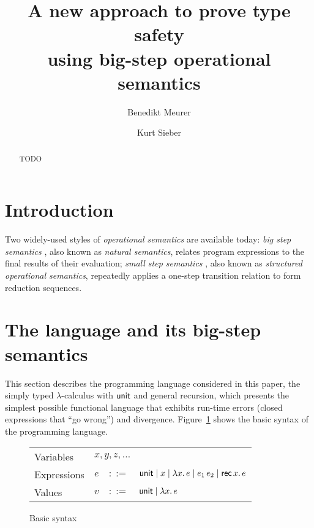 \documentclass[12pt,a2paper,draft]{article}
\newcommand{\abstr}[2]{\ensuremath{\lambda{#1}.\,{#2}}}
\newcommand{\app}[2]{\ensuremath{{#1}\,{#2}}}
\newcommand{\rec}[2]{\ensuremath{{\normalfont\textsf{rec}}\,{#1}.\,{#2}}}
\newcommand{\unit}{\ensuremath{\normalfont\textsf{unit}}}
\begin{document}
\title{%
  A new approach to prove type safety\\using big-step operational semantics
}
\author{Benedikt Meurer}
\author{Kurt Sieber}
\date{}
\maketitle
\begin{abstract}
  TODO
\end{abstract}


\section{Introduction}

Two widely-used styles of \emph{operational semantics} are available today: \emph{big step semantics} \cite{Kahn87},
also known as \emph{natural semantics}, relates program expressions to the final results of their
evaluation; \emph{small step semantics} \cite{Plotkin81,Plotkin04}, also known as
\emph{structured operational semantics}, repeatedly applies a one-step transition relation to
form reduction sequences.


\section{The language and its big-step semantics}

This section describes the programming language considered in this paper,
the simply typed $\lambda$-calculus with $\unit$ and general recursion, which
presents the simplest possible functional language that exhibits run-time
errors (closed expressions that ``go wrong'') and divergence. Figure~\ref{figure:Basic_syntax}
shows the basic syntax of the programming language.

\begin{figure}[htb]
  \centering
  \begin{tabular}{llcl}
    Variables   & \multicolumn{3}{l}{$x,y,z,\ldots$} \\
    Expressions & $e$ & $::=$ & $\unit \mid x \mid \abstr{x}{e} \mid \app{e_1}{e_2} \mid \rec{x}{e}$ \\
    Values      & $v$ & $::=$ & $\unit \mid \abstr{x}{e}$
  \end{tabular}
  \caption{Basic syntax}
  \label{figure:Basic_syntax}
\end{figure}
\end{document}
